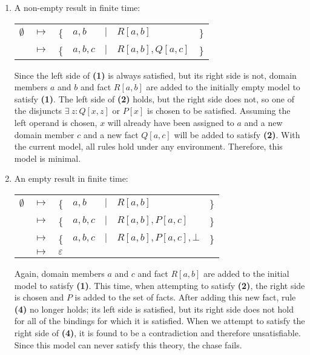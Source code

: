 		\begin{enumerate}
		\item A non-empty result in finite time:

			\begin{tabular}{lllllll}
				$\emptyset$ & $\mapsto$ & \{ & $a,b$   & $|$ & $R[a,b]$         & \} \\
				{}          & $\mapsto$ & \{ & $a,b,c$ & $|$ & $R[a,b], Q[a,c]$ & \} \\
			\end{tabular}

			Since the left side of \textbf{(1)} is always satisfied, but its
			right side is not, domain members $a$ and $b$ and fact $R[a,b]$ are
			added to the initially empty model to satisfy \textbf{(1)}. The
			left side of \textbf{(2)} holds, but the right side does not, so
			one of the disjuncts $\exists\ z : Q[x,z]$ or $P[x]$ is chosen to
			be satisfied. Assuming the left operand is chosen, $x$ will already
			have been assigned to $a$ and a new domain member $c$ and a new
			fact $Q[a,c]$ will be added to satisfy \textbf{(2)}. With the
			current model, all rules hold under any environment. Therefore,
			this model is minimal.

		\item An empty result in finite time:

			\begin{tabular}{lllllll}
				$\emptyset$ & $\mapsto$ & \{ & $a,b$   & $|$ & $R[a,b]$               & \} \\
				{}          & $\mapsto$ & \{ & $a,b,c$ & $|$ & $R[a,b], P[a,c]$       & \} \\
				{}          & $\mapsto$ & \{ & $a,b,c$ & $|$ & $R[a,b], P[a,c], \bot$ & \} \\
				{}          & $\mapsto$ & \multicolumn{5}{l}{ $\varepsilon$ }              \\
			\end{tabular}

			Again, domain members $a$ and $c$ and fact $R[a,b]$ are added to
			the initial model to satisfy \textbf{(1)}.  This time, when
			attempting to satisfy \textbf{(2)}, the right side is chosen and
			$P$ is added to the set of facts. After adding this new fact, rule
			\textbf{(4)} no longer holds; its left side is satisfied, but its
			right side does not hold for all of the bindings for which it is
			satisfied. When we attempt to satisfy the right side of
			\textbf{(4)}, it is found to be a contradiction and therefore
			unsatisfiable. Since this model can never satisfy this theory, the
			chase fails.


\end{enumerate}
